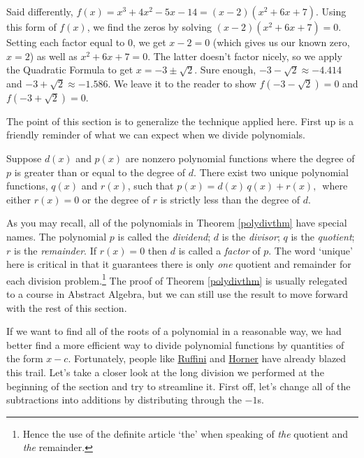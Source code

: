Said differently, $f(x) = x^3 + 4x^2-5x-14=(x-2)\left(x^2+6x+7\right)$.  Using this form of $f(x)$, we find the zeros by solving $(x-2)\left(x^2+6x+7\right)=0$.  Setting each factor equal to $0$, we get  $x-2=0$ (which gives us our known zero, $x=2$) as well as $x^2+6x+7=0$.   The latter doesn't factor nicely, so we apply the Quadratic Formula to get $x = -3 \pm \sqrt{2}$.  Sure enough, $-3 - \sqrt{2} \approx -4.414$ and $-3 +\sqrt{2} \approx -1.586$.  We leave it to the reader to show $f(-3-\sqrt{2}) = 0$ and $f(-3+\sqrt{2}) = 0$. %

The point of this section is to generalize the technique applied here.  First up is a friendly reminder of what we can expect when we divide polynomials. 

\begin{theorem1}[polydivthm]{}
Suppose $d(x)$ and $p(x)$ are nonzero polynomial functions where the degree of $p$ is greater than or equal to the degree of $d$.  There exist two unique polynomial functions, $q(x)$ and $r(x)$, such that $p(x) = d(x) \, q(x) + r(x),\,$ where either $r(x) = 0$ or the degree of $r$ is strictly less than the degree of $d$. 
\end{theorem1}

As you may recall, all of the polynomials in Theorem \ref{polydivthm} have special names.  The polynomial $p$ is called the  \emph{dividend}; $d$ is the  \emph{divisor}; $q$ is the  \emph{quotient}; $r$ is the  \emph{remainder}.  If $r(x)=0$ then $d$ is called a  \emph{factor} of $p$.  The word `unique' here is critical in that it guarantees there is only \textit{one} quotient and remainder for each division problem.\footnote{Hence the use of the definite article `the' when speaking of \textit{the} quotient and \textit{the} remainder.} The proof of Theorem \ref{polydivthm} is usually relegated to a course in Abstract Algebra, but we can still use the result to move forward with the rest of this section.

If we want to find all of the roots of a polynomial in a reasonable way, we had better find a more efficient way to divide polynomial functions by quantities of the form $x-c$.  Fortunately, people like \href{http://en.wikipedia.org/wiki/Synthetic_division}{Ruffini} and \href{http://en.wikipedia.org/wiki/Horner_scheme}{Horner} have already blazed this trail.  Let's take a closer look at the long division we performed at the beginning of the section and try to streamline it.  First off, let's change all of the subtractions into additions by distributing through the $-1$s.


